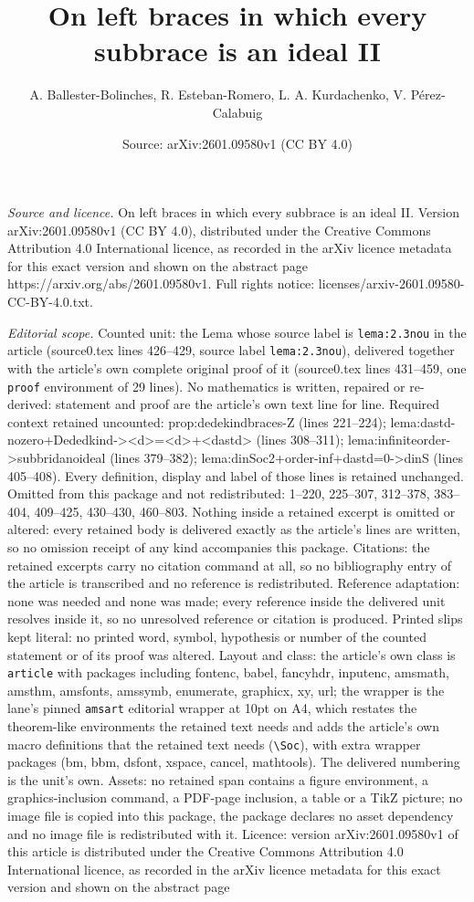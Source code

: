 \documentclass[10pt,a4paper]{amsart}
\title[On left braces in which every subbrace is an ideal II]{On left braces in which every subbrace is an ideal II}
\author{A. Ballester-Bolinches, R. Esteban-Romero, L. A. Kurdachenko, V. P\'erez-Calabuig}
\date{Source: arXiv:2601.09580v1 (CC BY 4.0)}
\begin{document}
\maketitle

\noindent\emph{Source and licence.} On left braces in which every subbrace is an ideal II. Version arXiv:2601.09580v1 (CC BY 4.0), distributed under the Creative Commons Attribution 4.0 International licence, as recorded in the arXiv licence metadata for this exact version and shown on the abstract page https://arxiv.org/abs/2601.09580v1. Full rights notice: licenses/arxiv-2601.09580-CC-BY-4.0.txt.\par\smallskip

\noindent\textit{Editorial scope.} Counted unit: the Lema whose source label is \texttt{lema:2.3nou} in the article (source0.tex lines 426--429, source label \texttt{lema:2.3nou}), delivered together with the article's own complete original proof of it (source0.tex lines 431--459, one \texttt{proof} environment of 29 lines). No mathematics is written, repaired or re-derived: statement and proof are the article's own text line for line. Required context retained uncounted: prop:dedekindbraces-Z (lines 221--224); lema:dastd-nozero+Dededkind-><d>=<d>+<dastd> (lines 308--311); lema:infiniteorder->subbridanoideal (lines 379--382); lema:dinSoc2+order-inf+dastd=0->dinS (lines 405--408). Every definition, display and label of those lines is retained unchanged. Omitted from this package and not redistributed: 1--220, 225--307, 312--378, 383--404, 409--425, 430--430, 460--803. Nothing inside a retained excerpt is omitted or altered: every retained body is delivered exactly as the article's lines are written, so no omission receipt of any kind accompanies this package. Citations: the retained excerpts carry no citation command at all, so no bibliography entry of the article is transcribed and no reference is redistributed. Reference adaptation: none was needed and none was made; every reference inside the delivered unit resolves inside it, so no unresolved reference or citation is produced. Printed slips kept literal: no printed word, symbol, hypothesis or number of the counted statement or of its proof was altered. Layout and class: the article's own class is \texttt{article} with packages including fontenc, babel, fancyhdr, inputenc, amsmath, amsthm, amsfonts, amssymb, enumerate, graphicx, xy, url; the wrapper is the lane's pinned \texttt{amsart} editorial wrapper at 10pt on A4, which restates the theorem-like environments the retained text needs and adds the article's own macro definitions that the retained text needs (\texttt{\textbackslash Soc}), with extra wrapper packages (bm, bbm, dsfont, xspace, cancel, mathtools). The delivered numbering is the unit's own. Assets: no retained span contains a figure environment, a graphics-inclusion command, a PDF-page inclusion, a table or a TikZ picture; no image file is copied into this package, the package declares no asset dependency and no image file is redistributed with it. Licence: version arXiv:2601.09580v1 of this article is distributed under the Creative Commons Attribution 4.0 International licence, as recorded in the arXiv licence metadata for this exact version and shown on the abstract page 
\end{document}
